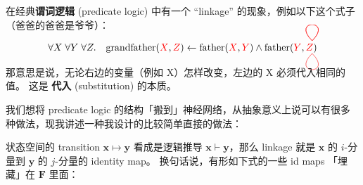 \documentclass[orivec]{llncs}
\newcommand{\emp}[1]{\textbf{\textcolor{Cerulean}{#1}}}
\newcommand{\vect}[1]{\boldsymbol{#1}}
\newcommand{\tikzmark}[1]{\tikz[overlay,remember picture] \node (#1) {};}
\begin{document}
在经典\textbf{谓词逻辑} (predicate logic) 中有一个 ``linkage'' 的现象，例如以下这个式子（爸爸的爸爸是爷爷）：

\begin{equation}
\forall X \; \forall Y \; \forall Z.  \quad  \text{grandfather}({\color{red}X} \tikzmark{x}, {\color{red}Z} \tikzmark{z}) \leftarrow \text{father}({\color{red}X} \tikzmark{p}, {\color{red}Y} \tikzmark{y}) \wedge \mbox{father}({\color{red}Y} \tikzmark{q}, {\color{red}Z} \tikzmark{r})
\begin{tikzpicture}[overlay,remember picture,out=45,in=135,distance=1.1cm]
  \draw[-,red, transform canvas={shift={(-5pt,10pt)}}] (x.center) to (p.center);
  \draw[-,red, transform canvas={shift={(-5pt,10pt)}}] (y.center) to (q.center);
  \draw[-,red, transform canvas={shift={(-5pt,-3pt)}}, out=-45,in=225] (z.center) to (r.center);
\end{tikzpicture}
\label{linkage-father}
\end{equation}

那意思是说，无论右边的变量（例如 X）怎样改变，左边的 X 必须代入相同的值。 这是 \emp{代入} (substitution) 的本质。



我们想将 predicate logic 的结构「搬到」神经网络，从抽象意义上说可以有很多种做法，现我讲述一种我设计的比较简单直接的做法：  

状态空间的 transition $\vect{x} \mapsto \vect{y}$ 看成是逻辑推导 $\vect{x} \vdash \vect{y}$，那么 linkage 就是 $\vect{x}$ 的 $i$-分量到 $\vect{y}$ 的 $j$-分量的 identity map。 换句话说，有形如下式的一些 id maps 「埋藏」在 $\vect{F}$ 里面：
\end{document}
